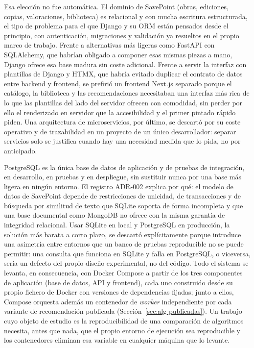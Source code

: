 Esa elección no fue automática. El dominio de SavePoint (obras, ediciones, copias,
valoraciones, biblioteca) es relacional y con mucha escritura estructurada, el tipo de
problema para el que Django y su ORM están pensados desde el principio, con autenticación,
migraciones y validación ya resueltos en el propio marco de trabajo.
Frente a alternativas más ligeras como FastAPI con SQLAlchemy, que habrían obligado a componer
esas mismas piezas a mano, Django ofrece esa base madura sin coste adicional. Frente a servir
la interfaz con plantillas de Django y HTMX, que habría evitado duplicar el contrato de datos
entre backend y frontend, se prefirió un frontend Next.js separado porque el catálogo,
la biblioteca y las recomendaciones necesitaban una interfaz más rica de lo que las plantillas del
lado del servidor ofrecen con comodidad, sin perder por ello el renderizado en servidor que la
accesibilidad y el primer pintado rápido piden. Una arquitectura de microservicios, por
último, se descartó por su coste operativo y de trazabilidad en un proyecto de un único
desarrollador: separar servicios solo se justifica cuando hay una necesidad medida que lo
pida, no por anticipado.

PostgreSQL es la única base de datos de aplicación y de pruebas de integración, en desarrollo,
en pruebas y en despliegue, sin sustituir nunca por una base más ligera en ningún entorno. El
registro ADR-002 explica por qué: el modelo de datos de SavePoint depende de restricciones de
unicidad, de transacciones y de búsqueda por similitud de texto que SQLite soporta de forma
incompleta y que una base documental como MongoDB no ofrece con la misma garantía de
integridad relacional. Usar SQLite en local y PostgreSQL en producción, la solución más
barata a corto plazo, se descartó explícitamente porque introduce una asimetría entre entornos
que un banco de pruebas reproducible no se puede permitir: una consulta que funciona en SQLite
y falla en PostgreSQL, o viceversa, sería un defecto del propio diseño experimental, no del
código. Todo el sistema se levanta, en consecuencia, con Docker Compose a partir de los tres
componentes de aplicación (base de datos, API y frontend), cada uno construido desde su propio
fichero de Docker con versiones de dependencias fijadas; junto a ellos, Compose orquesta además un contenedor de \textit{worker} independiente por cada
variante de recomendación publicada (Sección~\ref{sec:alg-publicadas}). Un trabajo cuyo objeto
de estudio es la reproducibilidad de una comparación de algoritmos necesita, antes que nada,
que el propio entorno de ejecución sea reproducible y los contenedores eliminan esa variable
en cualquier máquina que lo levante.

